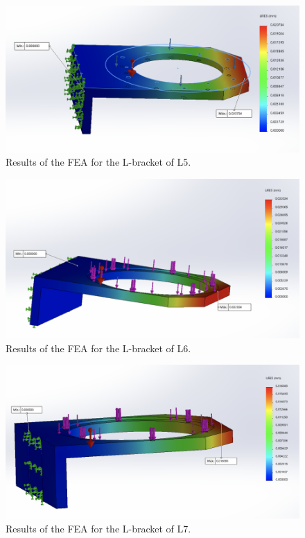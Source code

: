 \documentclass{report}
\begin{document}
\begin{figure}
\centering
\includegraphics[width=0.8\linewidth]{figures/FEAL5.png}
\caption{Results of the FEA for the L-bracket of L5.}
\label{figure:FEAL5}
\end{figure}

\begin{figure}
\centering
\includegraphics[width=0.8\linewidth]{figures/FEAL6.png}
\caption{Results of the FEA for the L-bracket of L6.}
\label{figure:FEAL6}
\end{figure}

\begin{figure}
\centering
\includegraphics[width=0.8\linewidth]{figures/FEAL7.png}
\caption{Results of the FEA for the L-bracket of L7.}
\label{figure:FEAL7}
\end{figure}
\end{document}
